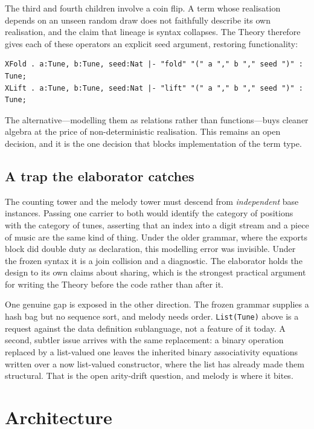 \documentclass[11pt,a4paper]{article}
\theoremstyle{definition}
\theoremstyle{plain}
\begin{document}
The third and fourth children involve a coin flip. A term whose realisation depends on an unseen
random draw does not faithfully describe its own realisation, and the claim that lineage is syntax
collapses. The Theory therefore gives each of these operators an explicit seed argument, restoring
functionality:

\begin{lstlisting}
XFold . a:Tune, b:Tune, seed:Nat |- "fold" "(" a "," b "," seed ")" : Tune;
XLift . a:Tune, b:Tune, seed:Nat |- "lift" "(" a "," b "," seed ")" : Tune;
\end{lstlisting}

The alternative---modelling them as relations rather than functions---buys cleaner algebra at the
price of non-deterministic realisation. This remains an open decision, and it is the one decision
that blocks implementation of the term type.

\subsection{A trap the elaborator catches}

The counting tower and the melody tower must descend from \emph{independent} base instances. Passing
one carrier to both would identify the category of positions with the category of tunes, asserting
that an index into a digit stream and a piece of music are the same kind of thing. Under the older
grammar, where the exports block did double duty as declaration, this modelling error was invisible.
Under the frozen syntax it is a join collision and a diagnostic. The elaborator holds the design to
its own claims about sharing, which is the strongest practical argument for writing the Theory
before the code rather than after it.

One genuine gap is exposed in the other direction. The frozen grammar supplies a hash bag but no
sequence sort, and melody needs order. \texttt{List(Tune)} above is a request against the data
definition sublanguage, not a feature of it today. A second, subtler issue arrives with the same
replacement: a binary operation replaced by a list-valued one leaves the inherited binary
associativity equations written over a now list-valued constructor, where the list has already made
them structural. That is the open arity-drift question, and melody is where it bites.

\section{Architecture}
\end{document}
